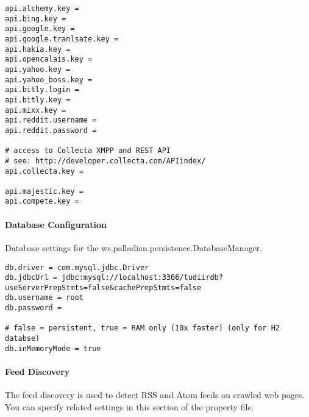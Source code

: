 \begin{verbatim}
api.alchemy.key = 
api.bing.key = 
api.google.key = 
api.google.tranlsate.key = 
api.hakia.key =
api.opencalais.key =
api.yahoo.key = 
api.yahoo_boss.key = 
api.bitly.login = 
api.bitly.key = 
api.mixx.key = 
api.reddit.username = 
api.reddit.password = 

# access to Collecta XMPP and REST API
# see: http://developer.collecta.com/APIindex/
api.collecta.key = 

api.majestic.key = 
api.compete.key = 
\end{verbatim}

\paragraph{Database Configuration}
Database settings for the ws.palladian.persistence.DatabaseManager.

\begin{verbatim}
db.driver = com.mysql.jdbc.Driver
db.jdbcUrl = jdbc:mysql://localhost:3306/tudiirdb?useServerPrepStmts=false&cachePrepStmts=false
db.username = root
db.password = 

# false = persistent, true = RAM only (10x faster) (only for H2 databse)
db.inMemoryMode = true 
\end{verbatim}

\paragraph{Feed Discovery}
\label{par:feeddiscovery}
The feed discovery is used to detect RSS and Atom feeds on crawled web pages. You can specify related settings in this section of the property file.

